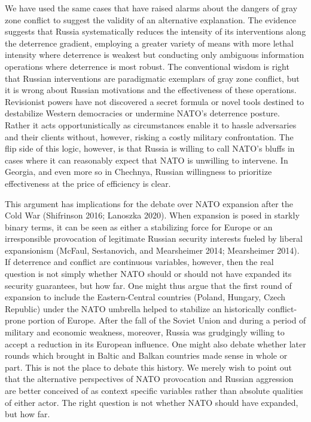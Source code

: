 \documentclass[
]{article}
\begin{document}
We have used the same cases that have raised alarms about the dangers of gray zone conflict to suggest the validity of an alternative explanation. The evidence suggests that Russia systematically reduces the intensity of its interventions along the deterrence gradient, employing a greater variety of means with more lethal intensity where deterrence is weakest but conducting only ambiguous information operations where deterrence is most robust. The conventional wisdom is right that Russian interventions are paradigmatic exemplars of gray zone conflict, but it is wrong about Russian motivations and the effectiveness of these operations. Revisionist powers have not discovered a secret formula or novel tools destined to destabilize Western democracies or undermine NATO's deterrence posture. Rather it acts opportunistically as circumstances enable it to hassle adversaries and their clients without, however, risking a costly military confrontation. The flip side of this logic, however, is that Russia is willing to call NATO's bluffs in cases where it can reasonably expect that NATO is unwilling to intervene. In Georgia, and even more so in Chechnya, Russian willingness to prioritize effectiveness at the price of efficiency is clear.

This argument has implications for the debate over NATO expansion after the Cold War (Shifrinson 2016; Lanoszka 2020). When expansion is posed in starkly binary terms, it can be seen as either a stabilizing force for Europe or an irresponsible provocation of legitimate Russian security interests fueled by liberal expansionism (McFaul, Sestanovich, and Mearsheimer 2014; Mearsheimer 2014). If deterrence and conflict are continuous variables, however, then the real question is not simply whether NATO should or should not have expanded its security guarantees, but how far. One might thus argue that the first round of expansion to include the Eastern-Central countries (Poland, Hungary, Czech Republic) under the NATO umbrella helped to stabilize an historically conflict-prone portion of Europe. After the fall of the Soviet Union and during a period of military and economic weakness, moreover, Russia was grudgingly willing to accept a reduction in its European influence. One might also debate whether later rounds which brought in Baltic and Balkan countries made sense in whole or part. This is not the place to debate this history. We merely wish to point out that the alternative perspectives of NATO provocation and Russian aggression are better conceived of as context specific variables rather than absolute qualities of either actor. The right question is not whether NATO should have expanded, but how far.
\end{document}
